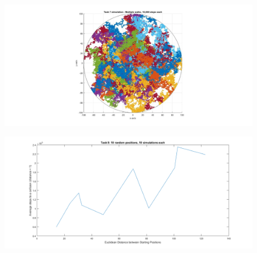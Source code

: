 \documentclass[10pt, a4paper]{article}
\begin{document}
\begin{figure}[H]
    \includegraphics[width=\textwidth]{Task 7 Testing/multiple_walks_task_7.jpeg}
    \caption{}
    \label{fig:9}
\end{figure}

\begin{figure}[H]
    \includegraphics[width=\textwidth]{Task 8 Testing/graph.png}
    \caption{}
    \label{fig:10}
\end{figure}
\end{document}
